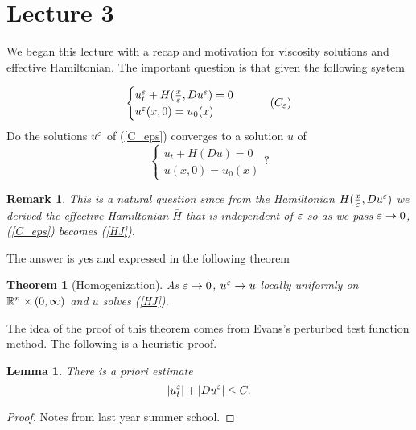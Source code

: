 \documentclass[11pt, oneside]{amsart}   	%
\newtheorem{remark}{Remark}
\newtheorem{theorem}{Theorem}
\newtheorem{lemma}{Lemma}
\begin{document}
\section*{Lecture 3}
We began this lecture with a recap and motivation for viscosity solutions and effective Hamiltonian. The important question is that given the following system

\begin{equation}
	\begin{cases}
		u^\eps_t + H(\frac{x}{\eps}, Du^\eps)=0\\
		u^\eps(x,0)=u_0(x)
	\end{cases}\tag{$C_\eps$}
\end{equation}
Do the solutions $u^\varepsilon$ of (\ref{C_eps}) converges to a solution $u$ of
\begin{equation}
	\begin{cases}
		u_t + \bar{H}(Du)=0\\
		u(x,0)=u_0(x)
	\end{cases}?\tag{HJ} \label{HJ}
\end{equation}
\begin{remark}
	This is a natural question  since from the Hamiltonian $H(\frac{x}{\varepsilon}, Du^\varepsilon)$ we derived the effective Hamiltonian $\bar{H}$ that is independent of $\varepsilon$ so as we pass $\varepsilon\to 0$, (\ref{C_eps}) becomes (\ref{HJ}).
\end{remark}
The answer is yes and expressed in the following theorem

\begin{theorem}[Homogenization]
	As $\varepsilon\to 0$, $u^\varepsilon\to u$ locally uniformly on $\mathbb{R}^n\times (0,\infty)$ and $u$ solves (\ref{HJ}).
\end{theorem}
The idea of the proof of this theorem comes from Evans's perturbed test function method. The following is a heuristic proof.

\begin{lemma}
	There is a priori estimate $$|u^\varepsilon_t|+|Du^\varepsilon| \le C.$$
\end{lemma}
\begin{proof} Notes from last year summer school.
\end{proof}
\end{document}
